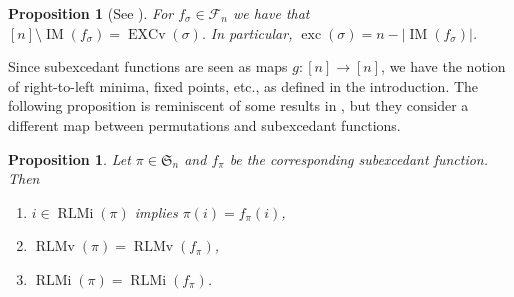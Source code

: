\documentclass[reqno]{amsart}
\newtheorem{proposition}[theorem]{Proposition}
\theoremstyle{definition}
\newcommand{\symS}{\mathfrak{S}}
\newcommand{\SEF}{\mathcal{F}}  %
\DeclareMathOperator{\exc}{exc}
\DeclareMathOperator{\EXCv}{EXCv}
\DeclareMathOperator{\RLMv}{RLMv}
\DeclareMathOperator{\RLMi}{RLMi}
\DeclareMathOperator{\supp}{IM}
\begin{document}
\begin{proposition}[{See \cite[Prop. 3.5]{MantaciRakotondrajao2001}}]\label{prop:excAsIm}
For $f_{\sigma} \in \SEF_n$ we have that
$
 [n] \setminus \supp(f_{\sigma}) = \EXCv(\sigma).
$
In particular, $\exc(\sigma) = n - |\supp(f_{\sigma})|$.
\end{proposition}

Since subexcedant functions are seen as maps $g:[n] \to [n]$,
we have the notion of right-to-left minima, fixed points, etc., as defined in the introduction.
%
The following proposition is reminiscent of some results in \cite{BarilVajnovszki2017},
but they consider a different map between permutations and subexcedant functions.
%
\begin{proposition}\label{prop:rlmForSEF}
Let $\pi\in\symS_n$ and $f_{\pi}$ be the corresponding subexcedant function. 
Then
\begin{enumerate}
    \item $i \in \RLMi(\pi)$ implies $\pi(i)=f_{\pi}(i)$,
    \item $\RLMv(\pi) = \RLMv(f_{\pi})$,
    \item $\RLMi(\pi) = \RLMi(f_{\pi})$.
\end{enumerate}
\end{proposition}
\end{document}
